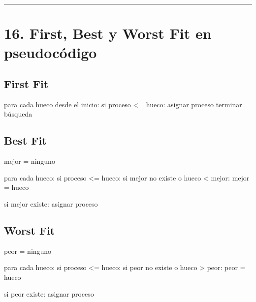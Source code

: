 \documentclass[
  spanish,
  letterpaper,
]{scrbook}
\newenvironment{Shaded}{\begin{snugshade}}{\end{snugshade}}
\newcommand{\NormalTok}[1]{\textcolor[rgb]{0.00,0.23,0.31}{#1}}
\begin{document}
\begin{center}\rule{0.5\linewidth}{0.5pt}\end{center}


\chapter{16. First, Best y Worst Fit en
pseudocódigo}\label{first-best-y-worst-fit-en-pseudocuxf3digo-1}

\section{First Fit}\label{first-fit-4}

\begin{Shaded}
\begin{Highlighting}[]
\NormalTok{para cada hueco desde el inicio:}
\NormalTok{    si proceso \textless{}= hueco:}
\NormalTok{        asignar proceso}
\NormalTok{        terminar búsqueda}
\end{Highlighting}
\end{Shaded}

\section{Best Fit}\label{best-fit-4}

\begin{Shaded}
\begin{Highlighting}[]
\NormalTok{mejor = ninguno}

\NormalTok{para cada hueco:}
\NormalTok{    si proceso \textless{}= hueco:}
\NormalTok{        si mejor no existe}
\NormalTok{           o hueco \textless{} mejor:}
\NormalTok{            mejor = hueco}

\NormalTok{si mejor existe:}
\NormalTok{    asignar proceso}
\end{Highlighting}
\end{Shaded}

\section{Worst Fit}\label{worst-fit-2}

\begin{Shaded}
\begin{Highlighting}[]
\NormalTok{peor = ninguno}

\NormalTok{para cada hueco:}
\NormalTok{    si proceso \textless{}= hueco:}
\NormalTok{        si peor no existe}
\NormalTok{           o hueco \textgreater{} peor:}
\NormalTok{            peor = hueco}

\NormalTok{si peor existe:}
\NormalTok{    asignar proceso}
\end{Highlighting}
\end{Shaded}
\end{document}
